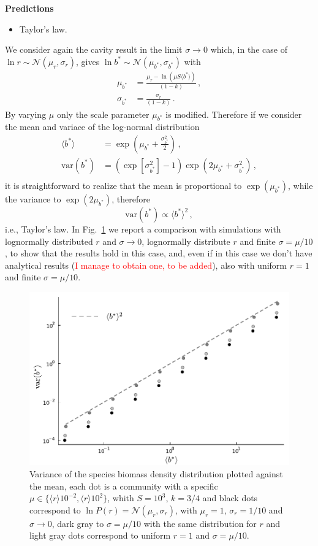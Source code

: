 \documentclass[10pt]{article}
\begin{document}
\textbf{Predictions}
\begin{itemize}
    \item Taylor's law.
\end{itemize}

We consider again the cavity result in the limit $\sigma\to0$
which, in the case of $\ln r\sim \mathcal N (\mu_r, \sigma_r)$,
gives $\ln b^*\sim\mathcal N (\mu_{b^*}, \sigma_{b^*})$ with
\begin{align}
    \mu_{b^*} &= \frac{\mu_r-\ln{(\mu S \langle b^* \rangle)}}{(1-k)} \, , \\
    \sigma_{b^*} &= \frac{\sigma_r}{(1-k)} \, .
\end{align}
By varying $\mu$ only the scale parameter $\mu_{b^*}$ is modified.
Therefore if we consider the mean and variace of the log-normal distribution
\begin{align}
    \langle b^* \rangle &= \exp{\left(\mu_{b^*}+\frac{\sigma_{b^*}^2}{2}\right)} \, , \\
    \textrm{var}(b^*)&=  
    \left(\exp[\sigma_{b^*}^2]-1\right)\exp{\left(2\mu_{b^*}+\sigma_{b^*}^2\right)}\, , \\
\end{align}
it is straightforward to realize that the mean is proportional to $\exp(\mu_{b^*})$, while
the variance to $\exp(2\mu_{b^*})$, therefore
\begin{equation}
    \textrm{var}(b^*) \propto  \langle b^* \rangle^2 \, ,
\end{equation}
i.e., Taylor's law.
In Fig.~\ref{fig: SM Taylor's law} we report a comparison 
with simulations with lognormally distributed $r$ and $\sigma\to0$, 
lognormally distribute $r$ and finite $\sigma=\mu/10$, to show
that the results hold in this case, and, even if in this case we don't have analytical results 
(\textcolor{red}{I manage to obtain one, to be added}),
also with uniform $r=1$ and 
finite $\sigma=\mu/10$.
\begin{figure}[h!]
    \centering
    \includegraphics[width=.8\textwidth]{fig/SM-taylor-complete.pdf}
    \caption{Variance of the species biomass density distribution plotted against the mean,
    each dot is a community with a specific $\mu\in\{\langle r\rangle10^{-2},\langle r\rangle10^{2}\}$,    
    whith $S=10^3$, $k=3/4$ and black dots correspond to $\ln{P(r)}=\mathcal{N} (\mu_r,\sigma_r)$, 
    with $\mu_r=1$, $\sigma_r=1/10$ and $\sigma\to0$, dark gray to $\sigma=\mu/10$ with the same distribution
    for $r$ and light gray dots correspond to uniform $r=1$ and $\sigma=\mu/10$.}
    \label{fig: SM Taylor's law}
\end{figure}
\end{document}
